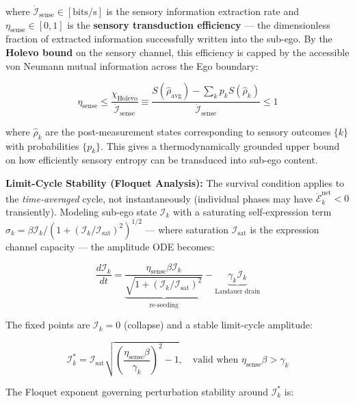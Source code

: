 \documentclass[11pt,a4paper]{article}
\theoremstyle{definition}
\theoremstyle{remark}
\begin{document}
where $\dot{\mathcal{I}}_{\text{sense}} \in [\text{bits/s}]$ is the sensory information extraction rate and $\eta_{\text{sense}} \in [0, 1]$ is the \textbf{sensory transduction efficiency} — the dimensionless fraction of extracted information successfully written into the sub-ego. By the \textbf{Holevo bound} on the sensory channel, this efficiency is capped by the accessible von Neumann mutual information across the Ego boundary:


\begin{equation}
\boxed{\eta_{\text{sense}} \leq \frac{\chi_{\text{Holevo}}}{\dot{\mathcal{I}}_{\text{sense}}} \equiv \frac{S(\hat{\rho}_{\text{avg}}) - \sum_k p_k S(\hat{\rho}_k)}{\dot{\mathcal{I}}_{\text{sense}}} \leq 1}
\end{equation}


where $\hat{\rho}_k$ are the post-measurement states corresponding to sensory outcomes $\{k\}$ with probabilities $\{p_k\}$. This gives a thermodynamically grounded upper bound on how efficiently sensory entropy can be transduced into sub-ego content.

\textbf{Limit-Cycle Stability (Floquet Analysis):} The survival condition applies to the \textit{time-averaged} cycle, not instantaneously (individual phases may have $\dot{\mathcal{E}}_k^{\text{net}} < 0$ transiently). Modeling sub-ego state $\mathcal{I}_k$ with a saturating self-expression term $\sigma_k = \beta \mathcal{I}_k / (1 + (\mathcal{I}_k/\mathcal{I}_{\text{sat}})^2)^{1/2}$ — where saturation $\mathcal{I}_{\text{sat}}$ is the expression channel capacity — the amplitude ODE becomes:


\begin{equation}
\frac{d\mathcal{I}_k}{dt} = \underbrace{\frac{\eta_{\text{sense}} \beta \mathcal{I}_k}{\sqrt{1 + (\mathcal{I}_k/\mathcal{I}_{\text{sat}})^2}}}_{\text{re-seeding}} - \underbrace{\gamma_k \mathcal{I}_k}_{\text{Landauer drain}}
\end{equation}


The fixed points are $\mathcal{I}_k = 0$ (collapse) and a stable limit-cycle amplitude:


\begin{equation}
\boxed{\mathcal{I}_k^* = \mathcal{I}_{\text{sat}}\sqrt{\left(\frac{\eta_{\text{sense}} \beta}{\gamma_k}\right)^2 - 1}, \quad \text{valid when } \eta_{\text{sense}} \beta > \gamma_k}
\end{equation}


The Floquet exponent governing perturbation stability around $\mathcal{I}_k^*$ is:
\end{document}
